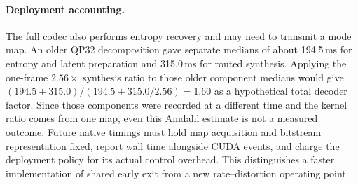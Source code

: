 \paragraph{Deployment accounting.}
The full codec also performs entropy recovery and may need to transmit a
mode map. An older QP32 decomposition gave separate medians of about
194.5\,ms for entropy and latent preparation and 315.0\,ms for routed
synthesis. Applying the one-frame $2.56\times$ synthesis ratio to those
older component medians would give
$(194.5+315.0)/(194.5+315.0/2.56)=1.60$ as a hypothetical total
decoder factor. Since those components were recorded at a different time
and the kernel ratio comes from one map, even this Amdahl estimate is not
a measured outcome. Future native timings must hold map acquisition and
bitstream representation fixed, report wall time alongside CUDA events,
and charge the deployment policy for its actual control overhead. This
distinguishes a faster implementation of shared early exit from a new
rate--distortion operating point.

